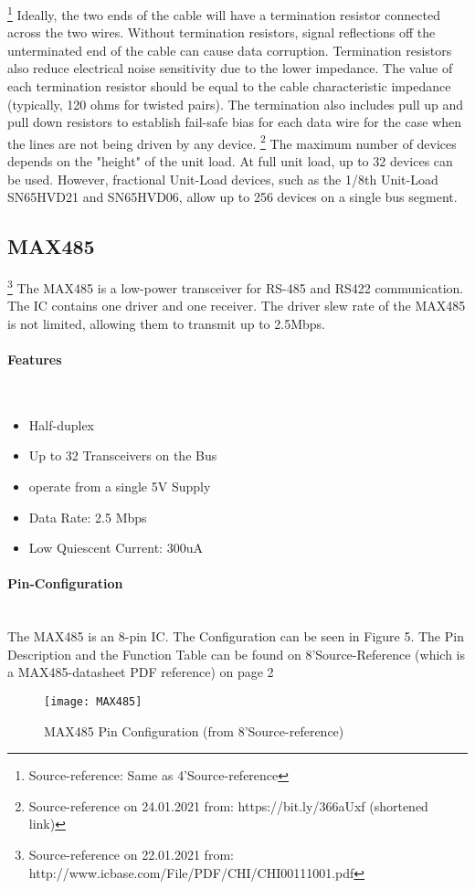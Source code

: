 \documentclass[11pt]{scrartcl}
\begin{document}
\newline\newline
\footnote{\label{foot:6}Source-reference: Same as 4'Source-reference}
Ideally, the two ends of the cable will have a termination resistor connected across the two wires. Without termination resistors, signal reflections off the unterminated end of the cable can cause data corruption. Termination resistors also reduce electrical noise sensitivity due to the lower impedance. The value of each termination resistor should be equal to the cable characteristic impedance (typically, 120 ohms for twisted pairs). The termination also includes pull up and pull down resistors to establish fail-safe bias for each data wire for the case when the lines are not being driven by any device.
\newline\newline
\footnote{\label{foot:7}Source-reference on 24.01.2021 from: https://bit.ly/366aUxf (shortened link)}
The maximum number of devices depends on the "height" of the unit load. At full unit load, up to 32 devices can be used. However,  fractional Unit-Load devices, such as the 1/8th Unit-Load SN65HVD21 and SN65HVD06, allow up to 256 devices on a single bus segment.



\newpage
	\subsection{MAX485}
\footnote{\label{foot:8}Source-reference on 22.01.2021 from: http://www.icbase.com/File/PDF/CHI/CHI00111001.pdf}
The MAX485 is a low-power transceiver for RS-485 and RS422 communication. The IC contains one driver and one receiver. The driver slew rate of the MAX485 is not limited, allowing them to transmit up to 2.5Mbps.
\paragraph{Features} \mbox{}\
\begin{itemize}
  \item Half-duplex
  \item Up to 32 Transceivers on the Bus
  \item operate from a single 5V Supply
  \item Data Rate: 2.5 Mbps
  \item Low Quiescent Current: 300uA
\end{itemize}
\paragraph{Pin-Configuration} \mbox{}\\
The MAX485 is an 8-pin IC. The Configuration can be seen in Figure 5. The Pin Description and the Function Table can be found on 8'Source-Reference (which is a MAX485-datasheet PDF reference) on page 2 \newline
\begin{figure}[h]
		\centering
		\texttt{[image: MAX485]}
		\caption{MAX485 Pin Configuration (from 8'Source-reference)}
\end{figure}	
\end{document}
